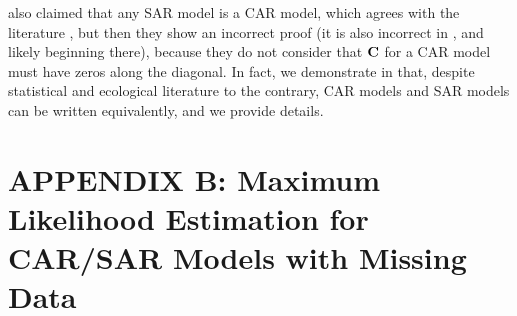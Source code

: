 \documentclass[11pt, titlepage]{article}\usepackage[]{graphicx}\usepackage[]{color}
\begin{document}
\begin{spacing}{1.9}
\begin{flushleft}
\citet{Dorm:etal:meth:2007} also claimed that any SAR model is a CAR model, which agrees with the literature \citep[e.g.,][p. 409]{Cres:stat:1993}, but then they show an incorrect proof (it is also incorrect in \citet[][p. 89]{Hain:spat:1990}, and likely beginning there), because they do not consider that $\mathbf{C}$ for a CAR model must have zeros along the diagonal.  In fact, we demonstrate in \citet{Ver:Hank:Hoot:2017} that, despite statistical and ecological literature to the contrary, CAR models and SAR models can be written equivalently, and we provide details.


\clearpage
\setcounter{equation}{0}
\renewcommand{\theequation}{B.\arabic{equation}}
\setcounter{figure}{0}
\renewcommand{\thefigure}{B.\arabic{figure}}
\section{APPENDIX B: Maximum Likelihood Estimation for CAR/SAR Models with Missing Data}


\end{flushleft}
\end{spacing}
\end{document}
